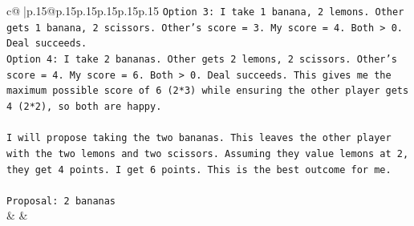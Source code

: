 \documentclass{article}
\begin{document}
{\begin{supertabular}{c@{$\;$}|p{.15\linewidth}@{}p{.15\linewidth}p{.15\linewidth}p{.15\linewidth}p{.15\linewidth}p{.15\linewidth}}
{{{\texttt{Option 3: I take 1 banana, 2 lemons. Other gets 1 banana, 2 scissors. Other's score = 3. My score = 4. Both > 0. Deal succeeds.} \\
\texttt{Option 4: I take 2 bananas. Other gets 2 lemons, 2 scissors. Other's score = 4. My score = 6. Both > 0. Deal succeeds. This gives me the maximum possible score of 6 (2*3) while ensuring the other player gets 4 (2*2), so both are happy.} \\
\\ 
\texttt{I will propose taking the two bananas. This leaves the other player with the two lemons and two scissors. Assuming they value lemons at 2, they get 4 points. I get 6 points. This is the best outcome for me.} \\
\\ 
\texttt{Proposal: 2 bananas} \\
            }
        }
    }
    & & \\ \\


\end{supertabular}}
\end{document}
